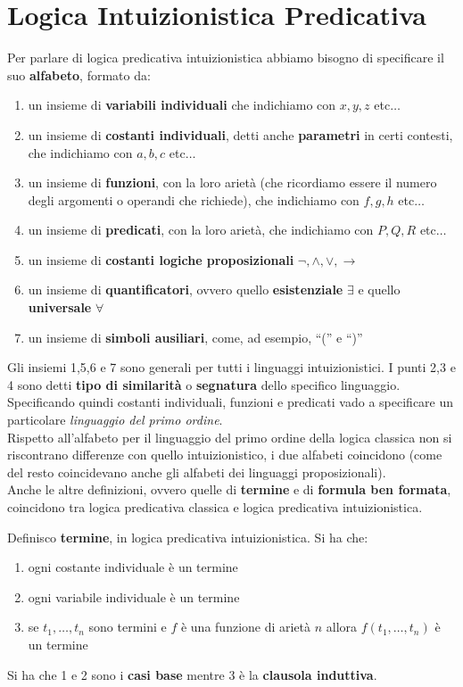 \documentclass[a4paper,12pt, oneside]{book}
\begin{document}
\section{Logica Intuizionistica Predicativa}
Per parlare di logica predicativa intuizionistica abbiamo bisogno di specificare
il suo \textbf{alfabeto}, formato da:
\begin{enumerate}
  \item un insieme di \textbf{variabili individuali} che indichiamo con $x,y,z$
  etc$\ldots$ 
  \item un insieme di \textbf{costanti individuali}, detti anche
  \textbf{parametri} in certi contesti, che indichiamo con $a,b,c$ etc$\ldots$ 
  \item un insieme di \textbf{funzioni}, con la loro arietà (che ricordiamo
  essere  il numero degli argomenti o operandi che richiede), che indichiamo con
  $f,g,h$ etc$\ldots$  
  \item un insieme di \textbf{predicati}, con la loro arietà, che indichiamo con
  $P,Q,R$ etc$\ldots$  
  \item un insieme di \textbf{costanti logiche proposizionali} $\neg, \land,
  \lor, \to$
  \item un insieme di \textbf{quantificatori}, ovvero quello
  \textbf{esistenziale} $\exists$ e quello \textbf{universale} $\forall$ 
  \item un insieme di \textbf{simboli ausiliari}, come, ad esempio, ``(''  e
  ``)'' 
\end{enumerate}
Gli insiemi 1,5,6 e 7 sono generali per tutti i linguaggi intuizionistici. I
punti 2,3 e 4 sono detti \textbf{tipo di similarità} o \textbf{segnatura} dello
specifico linguaggio. Specificando quindi costanti individuali, funzioni e
predicati vado a specificare un particolare \textit{linguaggio del primo
  ordine}.\\
Rispetto all'alfabeto per il linguaggio del primo ordine della logica classica
non si riscontrano differenze con quello intuizionistico, i due alfabeti
coincidono (come del resto coincidevano anche gli alfabeti dei linguaggi
proposizionali). \\
Anche le altre definizioni, ovvero quelle di \textbf{termine} e
di \textbf{formula ben formata}, coincidono tra logica predicativa classica e
logica predicativa intuizionistica.
\begin{definizione}
  Definisco \textbf{termine}, in logica predicativa intuizionistica. Si ha che:
  \begin{enumerate}
    \item ogni costante individuale è un termine
    \item ogni variabile individuale è un termine
    \item se $t_1,\ldots, t_n$ sono termini e $f$ è una funzione di arietà $n$
    allora $f(t_1,\ldots, t_n)$ è un termine  
  \end{enumerate}
  Si ha che 1 e 2 sono i \textbf{casi base} mentre 3 è la \textbf{clausola
    induttiva}.
\end{definizione}
\end{document}
